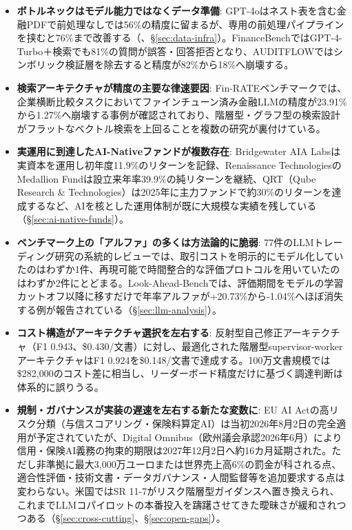 \begin{itemize}
  \item \textbf{ボトルネックはモデル能力ではなくデータ準備}: GPT-4oはネスト表を含む金融PDFで前処理なしでは56\%の精度に留まるが、専用の前処理パイプラインを挟むと76\%まで改善する（\cite{multistructured2025}、\S\ref{sec:data-infra}）。FinanceBenchではGPT-4-Turbo＋検索でも81\%の質問が誤答・回答拒否となり\cite{financebench2023}、AUDITFLOWではシンボリック検証層を除去すると精度が82\%から18\%へ崩壊する\cite{auditflow2026}。
  \item \textbf{検索アーキテクチャが精度の主要な律速要因}: Fin-RATEベンチマークでは、企業横断比較タスクにおいてファインチューン済み金融LLMの精度が23.91\%から1.27\%へ崩壊する事例が確認されており\cite{finrate2026}、階層型・グラフ型の検索設計がフラットなベクトル検索を上回ることを複数の研究が裏付けている。
  \item \textbf{実運用に到達したAI-Nativeファンドが複数存在}: Bridgewater AIA Labsは実資本を運用し初年度11.9\%のリターンを記録\cite{bridgewater_aialabs_nd}、Renaissance TechnologiesのMedallion Fundは設立来年率39.9\%の純リターンを継続\cite{institutionalinvestor2025renaissance}、QRT（Qube Research \& Technologies）は2025年に主力ファンドで約30\%のリターンを達成する\cite{bloomberg_qube2026}など、AIを核とした運用体制が既に大規模な実績を残している（\S\ref{sec:ai-native-funds}）。
  \item \textbf{ベンチマーク上の「アルファ」の多くは方法論的に脆弱}: 77件のLLMトレーディング研究の系統的レビューでは、取引コストを明示的にモデル化していたのはわずか1件、再現可能で時間整合的な評価プロトコルを用いていたのはわずか2件にとどまる\cite{agentictrading2026}。Look-Ahead-Benchでは、評価期間をモデルの学習カットオフ以降に移すだけで年率アルファが+20.73\%から-1.04\%へほぼ消失する例が報告されている\cite{lookaheadbench2026}（\S\ref{sec:llm-analysis}）。
  \item \textbf{コスト構造がアーキテクチャ選択を左右する}: 反射型自己修正アーキテクチャ（F1 0.943、\$0.430/文書）に対し、最適化された階層型supervisor-workerアーキテクチャはF1 0.924を\$0.148/文書で達成する\cite{benchmarkingmultiagent2026}。100万文書規模では\$282,000のコスト差に相当し、リーダーボード精度だけに基づく調達判断は体系的に誤りうる。
  \item \textbf{規制・ガバナンスが実装の遅速を左右する新たな変数に}: EU AI Actの高リスク分類（与信スコアリング・保険料算定AI）は当初2026年8月2日の完全適用が予定されていたが、Digital Omnibus（欧州議会承認2026年6月）により信用・保険AI義務の拘束的期限は2027年12月2日へ約16カ月延期された\cite{eba2025aiact,x07digitalomnibus2026}。ただし非準拠に最大3,000万ユーロまたは世界売上高6\%の罰金が科される点、適合性評価・技術文書・データガバナンス・人間監督等を追加要求する点は変わらない。米国ではSR 11-7がリスク階層型ガイダンスへ置き換えられ\cite{databricksndmodelrisk}、これまでLLMコパイロットの本番投入を躊躇させてきた曖昧さが緩和されつつある（\S\ref{sec:cross-cutting}、\S\ref{sec:open-gaps}）。

\end{itemize}

